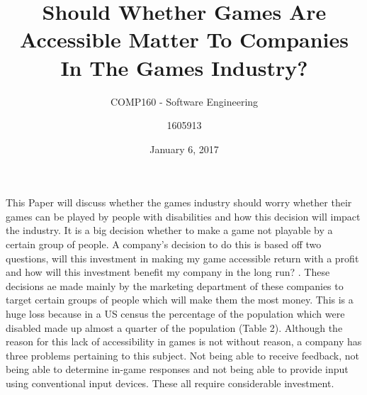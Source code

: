 \documentclass[11pt]{scrartcl}
\title{Should Whether Games Are Accessible Matter To Companies In The Games Industry?}
\date{January 6, 2017}
\subtitle{COMP160 - Software Engineering}
\author{1605913}
\begin{document}
\maketitle


This Paper will discuss whether the games industry should worry whether their games can be played by people with disabilities and how this decision will impact the industry. It is a big decision whether to make a game not playable by a certain group of people. A company’s decision to do this is based off two questions, will this investment in making my game accessible return with a profit and how will this investment benefit my company in the long run? \cite{bierre2005game}. These decisions ae made mainly by the marketing department of these companies to target certain groups of people which will make them the most money\cite{kalapanidas2009playmancer}. This is a huge loss because in a US census the percentage of the population which were disabled made up almost a quarter of the population\cite{bierre2005game} (Table 2). Although the reason for this lack of accessibility in games is not without reason, a company has three problems pertaining to this subject. Not being able to receive feedback, not being able to determine in-game responses and not being able to provide input using conventional input devices. These all require considerable investment\cite{yuan2011game}.




\end{document}
